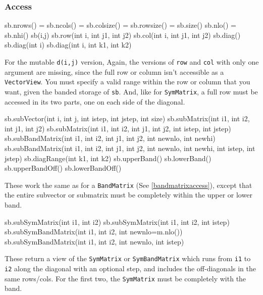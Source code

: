 \documentclass[twoside,letterpaper,11pt]{article}
\renewcommand{\tt}[1]{{\lstinline {#1}}}
\begin{document}
\subsubsection{Access}

\begin{tmvcode}
sb.nrows() = sb.ncols() = sb.colsize() = sb.rowsize() = sb.size()
sb.nlo() = sb.nhi()
sb(i,j)
sb.row(int i, int j1, int j2)
sb.col(int i, int j1, int j2)
sb.diag()
sb.diag(int i)
sb.diag(int i, int k1, int k2)
\end{tmvcode}
For the mutable \tt{d(i,j)} version, 
Again, the versions of \tt{row} and \tt{col} with only one argument are
missing, since the full row or column isn't accessible as a \tt{VectorView}.
You must specify a valid range within the row or column that you want, 
given the banded storage of \tt{sb}.  And, like for \tt{SymMatrix}, a full row
must be accessed in its two parts, one on each side of the diagonal.

\begin{tmvcode}
sb.subVector(int i, int j, int istep, int jstep, int size)
sb.subMatrix(int i1, int i2, int j1, int j2)
sb.subMatrix(int i1, int i2, int j1, int j2, int istep, int jstep)
sb.subBandMatrix(int i1, int i2, int j1, int j2, int newnlo, int newhi)
sb.subBandMatrix(int i1, int i2, int j1, int j2, int newnlo, int newhi, 
      int istep, int jstep)
sb.diagRange(int k1, int k2)
sb.upperBand()
sb.lowerBand()
sb.upperBandOff()
sb.lowerBandOff()
\end{tmvcode}
These work the same as for a \tt{BandMatrix}
(See \ref{bandmatrixaccess}),
except that the entire
subvector or submatrix must be completely within the upper or lower band.


\begin{tmvcode}
sb.subSymMatrix(int i1, int i2)
sb.subSymMatrix(int i1, int i2, int istep)
sb.subSymBandMatrix(int i1, int i2, int newnlo=m.nlo())
sb.subSymBandMatrix(int i1, int i2, int newnlo, int istep)
\end{tmvcode}
These return a view of the \tt{SymMatrix} or \tt{SymBandMatrix} which runs
from \tt{i1} to \tt{i2} along the diagonal with an optional step,
and includes the off-diagonals in the same rows/cols.  For the first two,
the \tt{SymMatrix} must be completely with the band.
\end{document}
